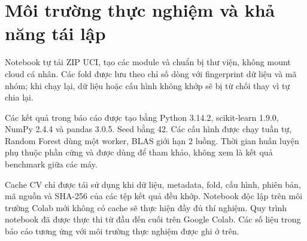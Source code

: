 \section{Môi trường thực nghiệm và khả năng tái lập}
\label{sec:5_1}
Notebook tự tải ZIP UCI, tạo các module và chuẩn bị thư viện, không mount cloud cá nhân. Các fold được lưu theo chỉ số dòng với fingerprint dữ liệu và mã nhóm; khi chạy lại, dữ liệu hoặc cấu hình không khớp sẽ bị từ chối thay vì tự chia lại.

Các kết quả trong báo cáo được tạo bằng Python 3.14.2, scikit-learn 1.9.0, NumPy 2.4.4 và pandas 3.0.5. Seed bằng 42. Các cấu hình được chạy tuần tự, Random Forest dùng một worker, BLAS giới hạn 2 luồng. Thời gian huấn luyện phụ thuộc phần cứng và được dùng để tham khảo, không xem là kết quả benchmark giữa các máy.

Cache CV chỉ được tái sử dụng khi dữ liệu, metadata, fold, cấu hình, phiên bản, mã nguồn và SHA-256 của các tệp kết quả đều khớp. Notebook độc lập trên môi trường Colab mới không có cache sẽ thực hiện đầy đủ thí nghiệm. Quy trình notebook đã được thực thi từ đầu đến cuối trên Google Colab. Các số liệu trong báo cáo tương ứng với môi trường thực nghiệm được ghi ở trên.
